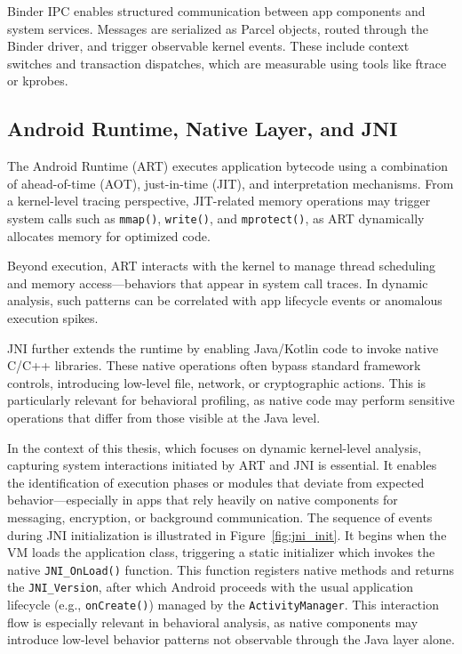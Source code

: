 \documentclass[a4paper,12pt]{report}
\begin{document}
Binder IPC enables structured communication between app components and system services. Messages are serialized as Parcel objects, routed through the Binder driver, and trigger observable kernel events. These include context switches and transaction dispatches, which are measurable using tools like ftrace or kprobes.

\subsection{Android Runtime, Native Layer, and JNI}
The Android Runtime (ART) executes application bytecode using a combination of ahead-of-time (AOT), just-in-time (JIT), and interpretation mechanisms. From a kernel-level tracing perspective, JIT-related memory operations may trigger system calls such as \texttt{mmap()}, \texttt{write()}, and \texttt{mprotect()}, as ART dynamically allocates memory for optimized code.

Beyond execution, ART interacts with the kernel to manage thread scheduling and memory access—behaviors that appear in system call traces. In dynamic analysis, such patterns can be correlated with app lifecycle events or anomalous execution spikes.

JNI further extends the runtime by enabling Java/Kotlin code to invoke native C/C++ libraries. These native operations often bypass standard framework controls, introducing low-level file, network, or cryptographic actions. This is particularly relevant for behavioral profiling, as native code may perform sensitive operations that differ from those visible at the Java level.

In the context of this thesis, which focuses on dynamic kernel-level analysis, capturing system interactions initiated by ART and JNI is essential. It enables the identification of execution phases or modules that deviate from expected behavior—especially in apps that rely heavily on native components for messaging, encryption, or background communication.
The sequence of events during JNI initialization is illustrated in Figure~\ref{fig:jni_init}.
It begins when the VM loads the application class, triggering a static initializer which invokes
the native \texttt{JNI\_OnLoad()} function. This function registers native methods and returns
the \texttt{JNI\_Version}, after which Android proceeds with the usual application lifecycle
(e.g., \texttt{onCreate()}) managed by the \texttt{ActivityManager}.
This interaction flow is especially relevant in behavioral analysis,
as native components may introduce low-level behavior patterns not observable through the Java layer alone.
\end{document}
